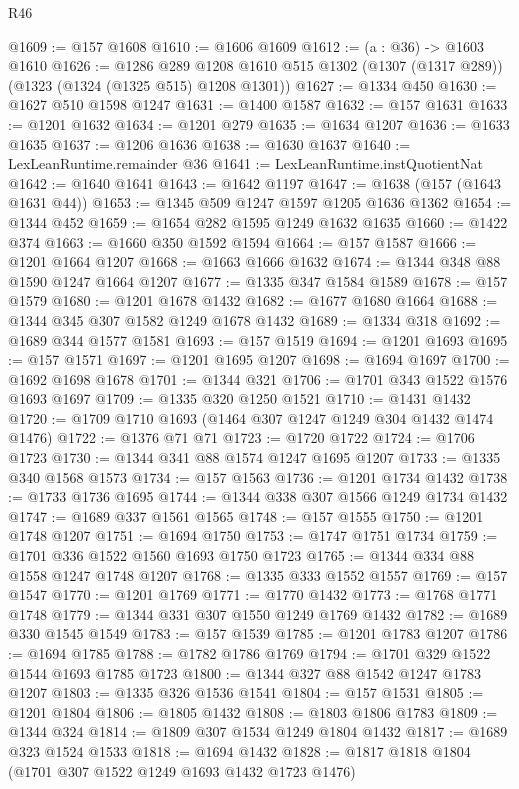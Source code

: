 \begin{lexlean}{R46}
\begin{coremodule}
@1609 := @157 @1608
@1610 := @1606 @1609
@1612 := (a : @36) -> @1603 @1610
@1626 := @1286
    @289
    @1208
    @1610
    @515
    @1302
    (@1307 (@1317 @289))
    (@1323 (@1324 (@1325 @515) @1208 @1301))
@1627 := @1334 @450
@1630 := @1627 @510 @1598 @1247
@1631 := @1400 @1587
@1632 := @157 @1631
@1633 := @1201 @1632
@1634 := @1201 @279
@1635 := @1634 @1207
@1636 := @1633 @1635
@1637 := @1206 @1636
@1638 := @1630 @1637
@1640 := LexLeanRuntime.remainder @36
@1641 := LexLeanRuntime.instQuotientNat
@1642 := @1640 @1641
@1643 := @1642 @1197
@1647 := @1638 (@157 (@1643 @1631 @44))
@1653 := @1345 @509 @1247 @1597 @1205 @1636 @1362
@1654 := @1344 @452
@1659 := @1654 @282 @1595 @1249 @1632 @1635
@1660 := @1422 @374
@1663 := @1660 @350 @1592 @1594
@1664 := @157 @1587
@1666 := @1201 @1664 @1207
@1668 := @1663 @1666 @1632
@1674 := @1344 @348 @88 @1590 @1247 @1664 @1207
@1677 := @1335 @347 @1584 @1589
@1678 := @157 @1579
@1680 := @1201 @1678 @1432
@1682 := @1677 @1680 @1664
@1688 := @1344 @345 @307 @1582 @1249 @1678 @1432
@1689 := @1334 @318
@1692 := @1689 @344 @1577 @1581
@1693 := @157 @1519
@1694 := @1201 @1693
@1695 := @157 @1571
@1697 := @1201 @1695 @1207
@1698 := @1694 @1697
@1700 := @1692 @1698 @1678
@1701 := @1344 @321
@1706 := @1701 @343 @1522 @1576 @1693 @1697
@1709 := @1335 @320 @1250 @1521
@1710 := @1431 @1432
@1720 := @1709 @1710 @1693 (@1464 @307 @1247 @1249 @304 @1432 @1474 @1476)
@1722 := @1376 @71 @71
@1723 := @1720 @1722
@1724 := @1706 @1723
@1730 := @1344 @341 @88 @1574 @1247 @1695 @1207
@1733 := @1335 @340 @1568 @1573
@1734 := @157 @1563
@1736 := @1201 @1734 @1432
@1738 := @1733 @1736 @1695
@1744 := @1344 @338 @307 @1566 @1249 @1734 @1432
@1747 := @1689 @337 @1561 @1565
@1748 := @157 @1555
@1750 := @1201 @1748 @1207
@1751 := @1694 @1750
@1753 := @1747 @1751 @1734
@1759 := @1701 @336 @1522 @1560 @1693 @1750 @1723
@1765 := @1344 @334 @88 @1558 @1247 @1748 @1207
@1768 := @1335 @333 @1552 @1557
@1769 := @157 @1547
@1770 := @1201 @1769
@1771 := @1770 @1432
@1773 := @1768 @1771 @1748
@1779 := @1344 @331 @307 @1550 @1249 @1769 @1432
@1782 := @1689 @330 @1545 @1549
@1783 := @157 @1539
@1785 := @1201 @1783 @1207
@1786 := @1694 @1785
@1788 := @1782 @1786 @1769
@1794 := @1701 @329 @1522 @1544 @1693 @1785 @1723
@1800 := @1344 @327 @88 @1542 @1247 @1783 @1207
@1803 := @1335 @326 @1536 @1541
@1804 := @157 @1531
@1805 := @1201 @1804
@1806 := @1805 @1432
@1808 := @1803 @1806 @1783
@1809 := @1344 @324
@1814 := @1809 @307 @1534 @1249 @1804 @1432
@1817 := @1689 @323 @1524 @1533
@1818 := @1694 @1432
@1828 := @1817 @1818 @1804 (@1701 @307 @1522 @1249 @1693 @1432 @1723 @1476)

\end{coremodule}
\end{lexlean}

